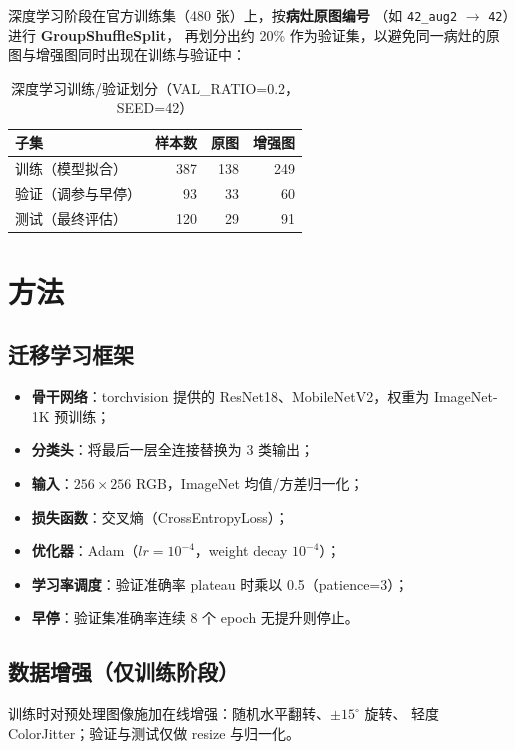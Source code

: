 \documentclass[12pt,a4paper]{ctexart}
\begin{document}
深度学习阶段在官方训练集（480 张）上，按\textbf{病灶原图编号}
（如 \texttt{42\_aug2} $\rightarrow$ \texttt{42}）进行 \textbf{GroupShuffleSplit}，
再划分出约 20\% 作为验证集，以避免同一病灶的原图与增强图同时出现在训练与验证中：
\begin{table}[H]
  \centering
  \caption{深度学习训练/验证划分（VAL\_RATIO=0.2，SEED=42）}
  \label{tab:dl_split}
  \begin{tabular}{lrrr}
    \toprule
    子集 & 样本数 & 原图 & 增强图 \\
    \midrule
    训练（模型拟合） & 387 & 138 & 249 \\
    验证（调参与早停） & 93  & 33  & 60  \\
    测试（最终评估）   & 120 & 29  & 91  \\
    \bottomrule
  \end{tabular}
\end{table}

\section{方法}

\subsection{迁移学习框架}
\begin{itemize}
  \item \textbf{骨干网络}：torchvision 提供的 ResNet18、MobileNetV2，权重为 ImageNet-1K 预训练；
  \item \textbf{分类头}：将最后一层全连接替换为 3 类输出；
  \item \textbf{输入}：$256\times256$ RGB，ImageNet 均值/方差归一化；
  \item \textbf{损失函数}：交叉熵（CrossEntropyLoss）；
  \item \textbf{优化器}：Adam（$lr=10^{-4}$，weight decay $10^{-4}$）；
  \item \textbf{学习率调度}：验证准确率 plateau 时乘以 0.5（patience=3）；
  \item \textbf{早停}：验证集准确率连续 8 个 epoch 无提升则停止。
\end{itemize}

\subsection{数据增强（仅训练阶段）}
训练时对预处理图像施加在线增强：随机水平翻转、$\pm15^\circ$ 旋转、
轻度 ColorJitter；验证与测试仅做 resize 与归一化。
\end{document}
